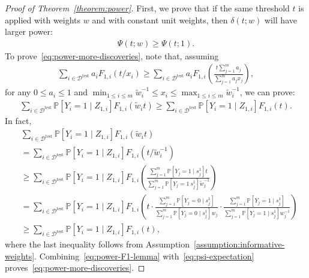 \documentclass[11pt]{article}
\renewcommand{\P}[1]{\mathbb{P}\left[#1\right]}
\begin{document}
\begin{proof}[Proof of Theorem~\ref{theorem:power}]
First, we prove that if the same threshold $t$ is applied with weights $w$ and with constant unit weights, then $\delta(t; w)$ will have larger power:
\begin{align} \label{eq:power-more-discoveries}
  \Psi(t;w) \geq \Psi(t;1).
\end{align}
To prove~\eqref{eq:power-more-discoveries}, note that, assuming
\begin{align*}
\sum_{i \in \mathcal{D}^{\mathrm{test}}} a_i F_{1,i}(t/x_i) \geq \sum_{i \in \mathcal{D}^{\mathrm{test}}} a_i F_{1,i}\left( \frac{t \sum_{j=1}^m a_j}{\sum_{j=1}^m a_jx_j} \right),
\end{align*}
for any $0\leq a_i\leq 1$ and $\min_{1 \leq i \leq m}\tilde w_i^{-1} \leq x_i \leq \max_{1 \leq i \leq m}\tilde w_i^{-1}$, we can prove:
\begin{align} \label{eq:power-F1-lemma}
  \sum_{i \in \mathcal{D}^{\mathrm{test}}}{ \P{Y_i = 1 \mid  Z_{1,i}} F_{1,i}(\tilde w_it )}
  \geq \sum_{i \in \mathcal{D}^{\mathrm{test}}}{ \P{Y_i = 1 \mid  Z_{1,i}} F_{1,i}(t)}.
\end{align}
In fact,
\begin{align*}
    & \sum_{i \in \mathcal{D}^{\mathrm{test}}}{ \P{Y_i = 1 \mid  Z_{1,i}} F_{1,i}(\tilde w_it )}\\
& = \sum_{i \in \mathcal{D}^{\mathrm{test}}}{ \P{Y_i = 1 \mid  Z_{1,i}} F_{1,i}(t/\tilde w_i^{-1} )}\\
    & \geq \sum_{i \in \mathcal{D}^{\mathrm{test}}} \P{Y_i = 1 \mid  Z_{1,i}} F_{1,i}\left(\frac{\sum_{j=1}^m{ \P{Y_j = 1 \mid  s^1_j} }t}{\sum_{j=1}^m \P{Y_j = 1 \ s^1_j} \tilde w_j^{-1}}\right)\\
    & =\sum_{i \in \mathcal{D}^{\mathrm{test}}} \P{Y_i = 1 \mid  Z_{1,i}} F_{1,i}\left(t\cdot \frac{\sum_{j=1}^m{ \P{Y_j = 0 \mid  s^1_j} }}{\sum_{j=1}^m \P{Y_j = 0 \mid  s^1_j} w_j} \cdot
    \frac{\sum_{j=1}^m{ \P{Y_j = 1 \mid  s^1_j} }}{\sum_{j=1}^m \P{Y_j = 1 \mid  s^1_j} w_j^{-1}} \right)\\
    & \geq \sum_{i \in \mathcal{D}^{\mathrm{test}}}{ \P{Y_i = 1 \mid  Z_{1,i}} F_{1,i}(t)},
\end{align*}
where the last inequality follows from Assumption~\ref{assumption:informative-weights}.
Combining~\eqref{eq:power-F1-lemma} with~\eqref{eq:psi-expectation} proves~\eqref{eq:power-more-discoveries}.


\end{proof}
\end{document}
